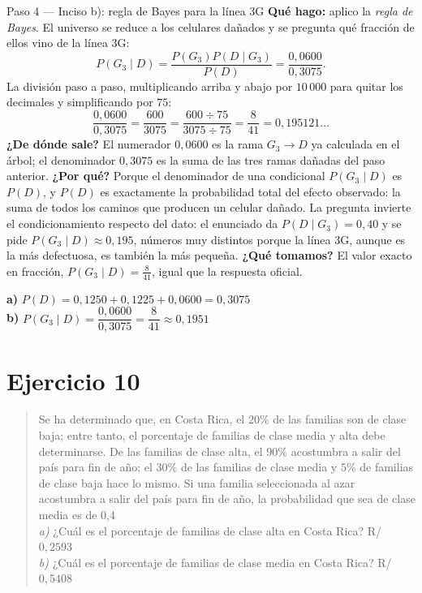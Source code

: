 \documentclass[11pt]{article}
\begin{document}
\begin{sol}
\begin{paso}{Paso 4 --- Inciso b): regla de Bayes para la línea 3G}
\textbf{Qué hago:} aplico la \emph{regla de Bayes}. El universo se reduce a los celulares dañados y se pregunta qué fracción de ellos vino de la línea 3G:
\[
P(G_3\mid D)=\frac{P(G_3)P(D\mid G_3)}{P(D)}=\frac{0,0600}{0,3075}.
\]
La división paso a paso, multiplicando arriba y abajo por $10\,000$ para quitar los decimales y simplificando por $75$:
\[
\frac{0,0600}{0,3075}=\frac{600}{3075}=\frac{600\div 75}{3075\div 75}=\frac{8}{41}=0,195121\ldots
\]
\textbf{¿De dónde sale?} El numerador $0,0600$ es la rama $G_3\to D$ ya calculada en el árbol; el denominador $0,3075$ es la suma de las tres ramas dañadas del paso anterior.
\textbf{¿Por qué?} Porque el denominador de una condicional $P(G_3\mid D)$ es $P(D)$, y $P(D)$ es exactamente la probabilidad total del efecto observado: la suma de todos los caminos que producen un celular dañado. La pregunta invierte el condicionamiento respecto del dato: el enunciado da $P(D\mid G_3)=0,40$ y se pide $P(G_3\mid D)\approx 0,195$, números muy distintos porque la línea 3G, aunque es la más defectuosa, es también la más pequeña.
\textbf{¿Qué tomamos?} El valor exacto en fracción, $P(G_3\mid D)=\tfrac{8}{41}$, igual que la respuesta oficial.
\end{paso}

\begin{resp}
\textbf{a)} $P(D)=0,1250+0,1225+0,0600=0,3075$\\
\textbf{b)} $P(G_3\mid D)=\dfrac{0,0600}{0,3075}=\dfrac{8}{41}\approx 0,1951$
\end{resp}

\end{sol}

\newpage
\section*{Ejercicio 10}

\begin{quote}
Se ha determinado que, en Costa Rica, el $20\%$ de las familias son de clase baja; entre tanto, el porcentaje de familias de clase media y alta debe determinarse. De las familias de clase alta, el $90\%$ acostumbra a salir del país para fin de año; el $30\%$ de las familias de clase media y $5\%$ de familias de clase baja hace lo mismo. Si una familia seleccionada al azar acostumbra a salir del país para fin de año, la probabilidad que sea de clase media es de 0,4\\
\emph{a)} ¿Cuál es el porcentaje de familias de clase alta en Costa Rica? \hfill R/ $0,2593$\\
\emph{b)} ¿Cuál es el porcentaje de familias de clase media en Costa Rica? \hfill R/ $0,5408$
\end{quote}
\end{document}
